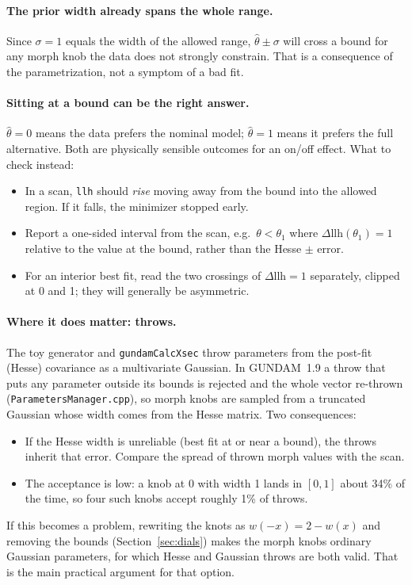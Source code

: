 \documentclass[11pt]{article}
\newcommand{\code}[1]{\texttt{#1}}
\begin{document}
\paragraph{The prior width already spans the whole range.} Since $\sigma=1$
equals the width of the allowed range, $\hat\theta\pm\sigma$ will cross a bound
for any morph knob the data does not strongly constrain. That is a consequence
of the parametrization, not a symptom of a bad fit.

\paragraph{Sitting at a bound can be the right answer.} $\hat\theta=0$ means the
data prefers the nominal model; $\hat\theta=1$ means it prefers the full
alternative. Both are physically sensible outcomes for an on/off effect. What
to check instead:
\begin{itemize}
  \item In a scan, \code{llh} should \emph{rise} moving away from the bound into
    the allowed region. If it falls, the minimizer stopped early.
  \item Report a one-sided interval from the scan, e.g.\ $\theta < \theta_{1}$ where
    $\Delta\text{llh}(\theta_{1}) = 1$ relative to the value at the bound, rather
    than the Hesse $\pm$ error.
  \item For an interior best fit, read the two crossings of $\Delta\text{llh}=1$
    separately, clipped at 0 and 1; they will generally be asymmetric.
\end{itemize}

\paragraph{Where it does matter: throws.} The toy generator and
\code{gundamCalcXsec} throw parameters from the post-fit (Hesse) covariance as a
multivariate Gaussian. In GUNDAM~1.9 a throw that puts any parameter outside its
bounds is rejected and the whole vector re-thrown
(\code{ParametersManager.cpp}), so morph knobs are sampled from a truncated
Gaussian whose width comes from the Hesse matrix. Two consequences:
\begin{itemize}
  \item If the Hesse width is unreliable (best fit at or near a bound), the
    throws inherit that error. Compare the spread of thrown morph values with
    the scan.
  \item The acceptance is low: a knob at 0 with width 1 lands in $[0,1]$ about
    34\% of the time, so four such knobs accept roughly 1\% of throws.
\end{itemize}
If this becomes a problem, rewriting the knots as $w(-x)=2-w(x)$ and removing
the bounds (Section~\ref{sec:dials}) makes the morph knobs ordinary Gaussian
parameters, for which Hesse and Gaussian throws are both valid. That is the
main practical argument for that option.
\end{document}
